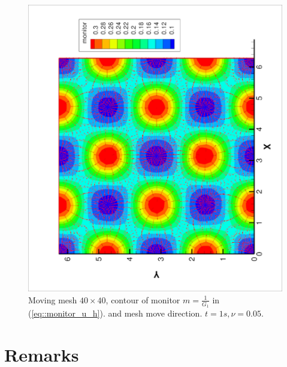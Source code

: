 \documentclass{article}
\begin{document}
 \begin{figure}[ht]
   \centering
   \includegraphics[width = 1.0\textwidth, angle = -90]{./moving40_movedirection.eps}
   \caption{\small Moving mesh $40 \times 40$,
     contour of monitor $m = \frac{1}{G_1}$ in (\ref{eq::monitor_u_h}).
     and mesh move direction. $t = 1s, \nu = 0.05$.}
   \label{fig::moving40_monitor}
 \end{figure}


\section{Remarks}




\end{document}
